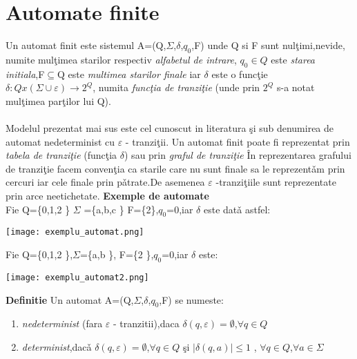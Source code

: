 \section{Automate finite}

Un automat finit este sistemul A=(Q,$\Sigma$,$\delta$,$q_{0}$,F) unde Q si F sunt nul\c timi,nevide, numite mul\c timea starilor respectiv \textit{ alfabetul de intrare}, $q_{0} \in Q $
este \textit{starea initiala},F$\subseteq$Q este \textit{multimea starilor finale} iar
$\delta$ este o func\c tie $\delta : Q x (\Sigma \cup {\varepsilon}) \rightarrow 2^{Q}$,
numita \textit{func\c tia de tranzi\c tie}
(unde prin $2^{Q}$ s-a notat mul\c timea par\c tilor lui Q).
\paragraph*{}
Modelul prezentat mai sus este cel cunoscut in literatura \c si sub denumirea de automat nedeterminist cu $\varepsilon$ - tranzi\c tii.
Un automat finit poate fi reprezentat prin \textit{tabela de tranzi\c tie} (func\c tia $\delta$) sau prin \textit{graful de tranzi\c tie}
\^In reprezentarea grafului de tranzi\c tie facem conven\c tia ca starile care nu sunt finale sa le reprezent\v am prin cercuri iar cele finale prin p\v atrate.De asemenea $\varepsilon$ -tranzi\c tiile sunt reprezentate prin arce neetichetate.
\textbf{Exemple de automate}\\
Fie Q=\{0,1,2 \} $\Sigma$ =\{a,b,c \} F=\{2\},$q_{0}$=0,iar $\delta$ este dat\v a astfel:

\texttt{[image: exemplu\_automat.png]}


Fie Q=\{0,1,2 \},$\Sigma$=\{a,b \},
F=\{2 \},$q_{0}$=0,iar $\delta$ este:

\texttt{[image: exemplu\_automat2.png]}

\textbf{Definitie} Un automat A=(Q,$\Sigma$,$\delta$,$q_{0}$,F) se numeste:
\begin{enumerate}


\item{\textit{nedeterminist} (fara $\varepsilon$ - tranzitii),daca $\delta(q,\varepsilon)=\emptyset$,$\forall q \in Q$}
\item{\textit{determinist},dac\v a
$\delta(q,\varepsilon)=\emptyset$,$\forall q \in Q $ \c si $|\delta(q,a)|\leq 1$ , $\forall q \in Q$,$\forall a \in \Sigma$ 
 } 
\end{enumerate}

